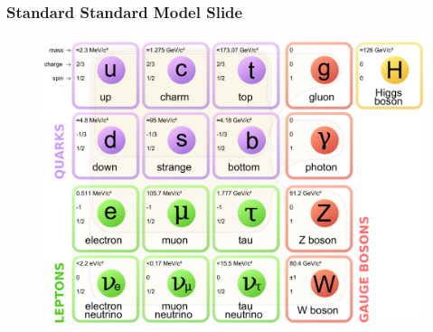 \documentclass[t]{beamer}
\newcommand{\addframe}[2]{
\begin{frame}
\frametitle{#1}
#2
\end{frame}
}
\newcommand{\additem}[1]{
\begin{itemize}
\item #1
\end{itemize}
}
\begin{document}
% 
% 
% 
% 
% 
% 

\addframe{Standard Standard Model Slide}{
\begin{figure}
\includegraphics[width=0.8\linewidth]{../figures/images/standard_model.png}
\end{figure}
}
\end{document}
